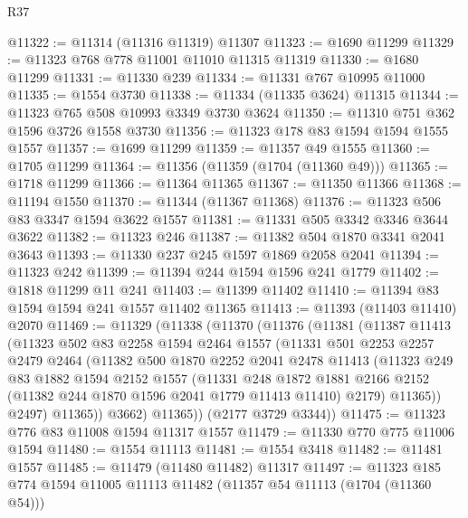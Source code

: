 \begin{lexlean}{R37}
\begin{coremodule}
@11322 := @11314 (@11316 @11319) @11307
@11323 := @1690 @11299
@11329 := @11323 @768 @778 @11001 @11010 @11315 @11319
@11330 := @1680 @11299
@11331 := @11330 @239
@11334 := @11331 @767 @10995 @11000
@11335 := @1554 @3730
@11338 := @11334 (@11335 @3624) @11315
@11344 := @11323 @765 @508 @10993 @3349 @3730 @3624
@11350 := @11310 @751 @362 @1596 @3726 @1558 @3730
@11356 := @11323 @178 @83 @1594 @1594 @1555 @1557
@11357 := @1699 @11299
@11359 := @11357 @49 @1555
@11360 := @1705 @11299
@11364 := @11356 (@11359 (@1704 (@11360 @49)))
@11365 := @1718 @11299
@11366 := @11364 @11365
@11367 := @11350 @11366
@11368 := @11194 @1550
@11370 := @11344 (@11367 @11368)
@11376 := @11323 @506 @83 @3347 @1594 @3622 @1557
@11381 := @11331 @505 @3342 @3346 @3644 @3622
@11382 := @11323 @246
@11387 := @11382 @504 @1870 @3341 @2041 @3643
@11393 := @11330 @237 @245 @1597 @1869 @2058 @2041
@11394 := @11323 @242
@11399 := @11394 @244 @1594 @1596 @241 @1779
@11402 := @1818 @11299 @11 @241
@11403 := @11399 @11402
@11410 := @11394 @83 @1594 @1594 @241 @1557 @11402 @11365
@11413 := @11393 (@11403 @11410) @2070
@11469 := @11329
    (@11338
      (@11370
        (@11376
          (@11381
            (@11387
              @11413
              (@11323
                @502
                @83
                @2258
                @1594
                @2464
                @1557
                (@11331
                  @501
                  @2253
                  @2257
                  @2479
                  @2464
                  (@11382
                    @500
                    @1870
                    @2252
                    @2041
                    @2478
                    @11413
                    (@11323
                      @249
                      @83
                      @1882
                      @1594
                      @2152
                      @1557
                      (@11331
                        @248
                        @1872
                        @1881
                        @2166
                        @2152
                        (@11382 @244 @1870 @1596 @2041 @1779 @11413 @11410)
                        @2179)
                      @11365))
                  @2497)
                @11365))
            @3662)
          @11365))
      (@2177 @3729 @3344))
@11475 := @11323 @776 @83 @11008 @1594 @11317 @1557
@11479 := @11330 @770 @775 @11006 @1594
@11480 := @1554 @11113
@11481 := @1554 @3418
@11482 := @11481 @1557
@11485 := @11479 (@11480 @11482) @11317
@11497 := @11323 @185 @774 @1594 @11005 @11113 @11482 (@11357 @54 @11113 (@1704 (@11360 @54)))

\end{coremodule}
\end{lexlean}
